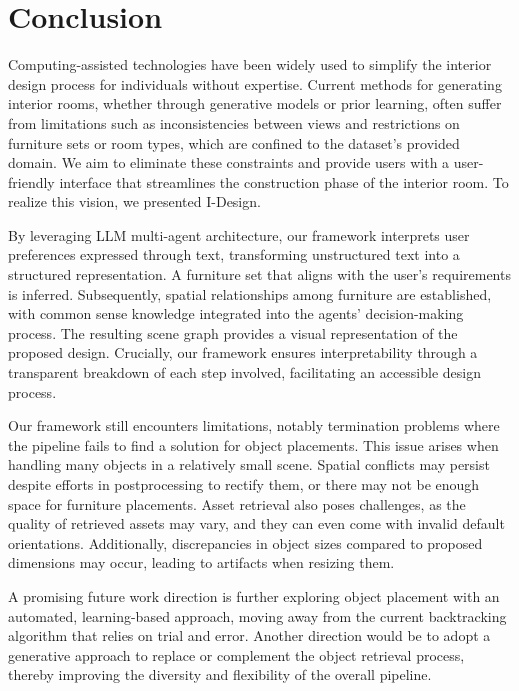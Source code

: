 \documentclass[runningheads]{llncs}
\newcommand{\methodname}{I-Design\xspace}
\begin{document}
\section{Conclusion}

Computing-assisted technologies have been widely used to simplify the interior design process for individuals without expertise. Current methods for generating interior rooms, whether through generative models or prior learning, often suffer from limitations such as inconsistencies between views and restrictions on furniture sets or room types, which are confined to the dataset's provided domain. We aim to eliminate these constraints and provide users with a user-friendly interface that streamlines the construction phase of the interior room. To realize this vision, we presented \methodname.

By leveraging LLM multi-agent architecture, our framework interprets user preferences expressed through text, transforming unstructured text into a structured representation. A furniture set that aligns with the user's requirements is inferred. Subsequently, spatial relationships among furniture are established, with common sense knowledge integrated into the agents' decision-making process. The resulting scene graph provides a visual representation of the proposed design. Crucially, our framework ensures interpretability through a transparent breakdown of each step involved, facilitating an accessible design process. 

Our framework still encounters limitations, notably termination problems where the pipeline fails to find a solution for object placements. This issue arises when handling many objects in a relatively small scene. Spatial conflicts may persist despite efforts in postprocessing to rectify them, or there may not be enough space for furniture placements.
Asset retrieval also poses challenges, as the quality of retrieved assets may vary, and they can even come with invalid default orientations. Additionally, discrepancies in object sizes compared to proposed dimensions may occur, leading to artifacts when resizing them.

A promising future work direction is further exploring object placement with an automated, learning-based approach, moving away from the current backtracking algorithm that relies on trial and error. Another direction would be to adopt a generative approach to replace or complement the object retrieval process, thereby improving the diversity and flexibility of the overall pipeline. 




\clearpage


\end{document}

